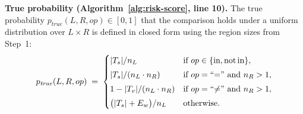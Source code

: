 \documentclass[pdflatex,sn-basic]{sn-jnl}%
\theoremstyle{thmstyleone}%
\theoremstyle{thmstyletwo}%
\theoremstyle{thmstylethree}%
\begin{document}
\smallskip
\textbf{True probability (Algorithm~\ref{alg:risk-score}, line 10).}
The true probability $p_{\mathit{true}}(L, R, op) \in [0, 1]$ that the comparison holds under a uniform distribution over $L \times R$ is defined in closed form using the region sizes from Step~1:
\[
p_{\mathit{true}}(L, R, op) \;=\;
\begin{cases}
|T_s| / n_L & \text{if } op \in \{\text{in}, \text{not\,in}\}, \\[3pt]
|T_s| / (n_L \cdot n_R) & \text{if } op = \text{``=''} \text{ and } n_R > 1, \\[3pt]
1 - |T_v| / (n_L \cdot n_R) & \text{if } op = \text{``$\neq$''} \text{ and } n_R > 1, \\[3pt]
\bigl(|T_s| + E_w\bigr) / n_L & \text{otherwise.}
\end{cases}
\]
\end{document}
